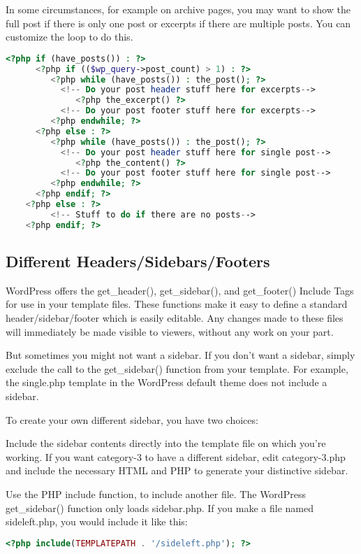 In some circumstances, for example on archive pages, you may want to show the full post if there is only one post or excerpts if there are multiple posts. You can customize the loop to do this.

\begin{lstlisting}[language=PHP]
	<?php if (have_posts()) : ?>
	  <?php if (($wp_query->post_count) > 1) : ?>
	     <?php while (have_posts()) : the_post(); ?>
	       <!-- Do your post header stuff here for excerpts-->
	          <?php the_excerpt() ?>
	       <!-- Do your post footer stuff here for excerpts-->
	     <?php endwhile; ?>
	  <?php else : ?>
	     <?php while (have_posts()) : the_post(); ?>
	       <!-- Do your post header stuff here for single post-->
	          <?php the_content() ?>
	       <!-- Do your post footer stuff here for single post-->
	     <?php endwhile; ?>
	  <?php endif; ?>
	<?php else : ?>
	     <!-- Stuff to do if there are no posts-->
	<?php endif; ?>
\end{lstlisting}

\subsection{Different Headers/Sidebars/Footers}

WordPress offers the get\_header(), get\_sidebar(), and get\_footer() Include Tags for use in your template files. These functions make it easy to define a standard header/sidebar/footer which is easily editable. Any changes made to these files will immediately be made visible to viewers, without any work on your part.

But sometimes you might not want a sidebar. If you don't want a sidebar, simply exclude the call to the get\_sidebar() function from your template. For example, the single.php template in the WordPress default theme does not include a sidebar.

To create your own different sidebar, you have two choices:

\begin{compactitem}
\item Include the sidebar contents directly into the template file on which you're working. If you want category-3 to have a different sidebar, edit category-3.php and include the necessary HTML and PHP to generate your distinctive sidebar.
\item Use the PHP include function, to include another file. The WordPress get\_sidebar() function only loads sidebar.php. If you make a file named sideleft.php, you would include it like this:

\begin{lstlisting}[language=PHP]
	<?php include(TEMPLATEPATH . '/sideleft.php'); ?>
\end{lstlisting}

\end{compactitem}

